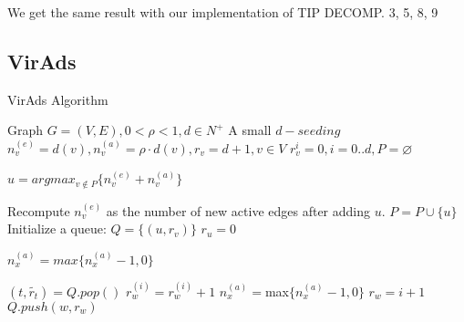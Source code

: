 We get the same result with our implementation of TIP DECOMP. 3, 5, 8, 9
\subsection{VirAds} 
\begin{algorithm}
	\caption{VirAds Algorithm}
	\begin{algorithmic}[1]
		
		\Require Graph $G = (V,E),0<\rho<1,d\in N^{+}$
		\Ensure A small $d-seeding$ 
		\State $n_{v}^{(e)} = d(v),n_{v}^{(a)} = \rho \cdot d(v), r_{v}  = d + 1, v \in V $
		\State $r_{v}^{i}=0, i=0..d, P  = \varnothing $
		
		\Repeat
		\State $u  = argmax_{v\not\in P}\{n_{v}^{(e)}+n_{v}^{(a)}\}$ 
		
		Recompute $n_{v}^{(e)}$ as the number of new active edges after adding $u$.
		\State $P  = P \cup \{u\} $
		\State Initialize a queue: $Q  = \{(u,r_{v})\} $
		\State $r_u = 0 $
		
		\State $n_{x}^{(a)}  = max\{n_{x}^{(a)}-1,0\} $
		
		\EndFor
		\State$(t,\widetilde{r_{t}})  = Q.pop() $
		\State $r_{w}^{(i)}=r_{w}^{(i)}+1 $
		\State $n_{x}^{(a)} =$max$\{n_{x}^{(a)}-1,0\} $	
		\EndFor
		\State $r_{w}=i+1 $
		\State $Q.push(w,r_{w}) $	
		\EndIf
		\EndIf
		\EndFor
		\EndFor
		\EndWhile
		\EndWhile
	\end{algorithmic}
\end{algorithm}
